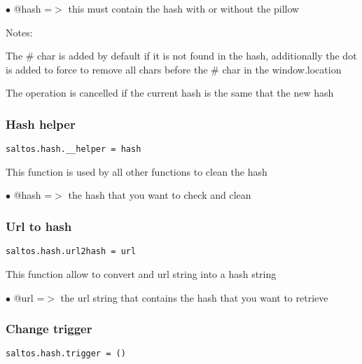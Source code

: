\documentclass[a4paper]{article}
\begin{document}
\begin{compactitem}
\item[\color{myblue}$\bullet$] @hash =$>$ this must contain the hash with or without the pillow
\end{compactitem}

Notes:

The \# char is added by default if it is not found in the hash, additionally the dot is
added to force to remove all chars before the \# char in the window.location

The operation is cancelled if the current hash is the same that the new hash

\hypertarget{toc812}{}
\subsubsection{Hash helper}

\begin{lstlisting}
saltos.hash.__helper = hash
\end{lstlisting}

This function is used by all other functions to clean the hash

\begin{compactitem}
\item[\color{myblue}$\bullet$] @hash =$>$ the hash that you want to check and clean
\end{compactitem}

\hypertarget{toc813}{}
\subsubsection{Url to hash}

\begin{lstlisting}
saltos.hash.url2hash = url
\end{lstlisting}

This function allow to convert and url string into a hash string

\begin{compactitem}
\item[\color{myblue}$\bullet$] @url =$>$ the url string that contains the hash that you want to retrieve
\end{compactitem}

\hypertarget{toc814}{}
\subsubsection{Change trigger}

\begin{lstlisting}
saltos.hash.trigger = ()
\end{lstlisting}
\end{document}
